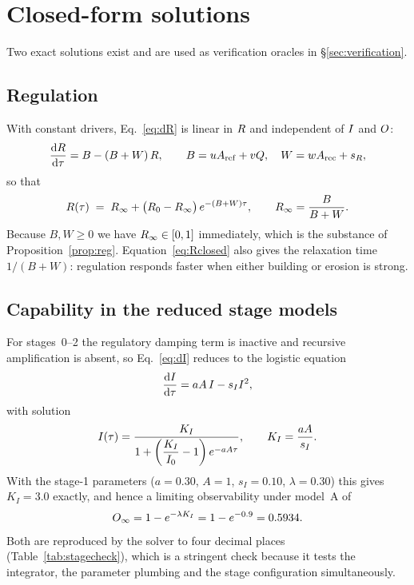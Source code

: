 \section{Closed-form solutions}
\label{app:closed}

Two exact solutions exist and are used as verification oracles in
\S\ref{sec:verification}.

\subsection{Regulation}

With constant drivers, Eq.~\eqref{eq:dR} is linear in $R$ and independent of
$I$ and $O$:
\begin{equation}
  \frac{\mathrm{d}R}{\mathrm{d}\tau} = B - (B+W)\,R ,
  \qquad B = uA_{\mathrm{ref}} + vQ, \quad W = wA_{\mathrm{rec}} + s_R ,
\end{equation}
so that
\begin{equation}
  R(\tau) \;=\; R_\infty + \big(R_0 - R_\infty\big)\,e^{-(B+W)\tau},
  \qquad R_\infty = \frac{B}{B+W} .
  \label{eq:Rclosed}
\end{equation}
Because $B,W \geq 0$ we have $R_\infty \in [0,1]$ immediately, which is the
substance of Proposition~\ref{prop:reg}. Equation~\eqref{eq:Rclosed} also gives
the relaxation time $1/(B+W)$: regulation responds faster when either building or
erosion is strong.

\subsection{Capability in the reduced stage models}

For stages~0--2 the regulatory damping term is inactive and recursive
amplification is absent, so Eq.~\eqref{eq:dI} reduces to the logistic equation
\begin{equation}
  \frac{\mathrm{d}I}{\mathrm{d}\tau} = aA\,I - s_I I^{2},
\end{equation}
with solution
\begin{equation}
  I(\tau) = \frac{K_I}{1 + \left(\dfrac{K_I}{I_0} - 1\right) e^{-aA\tau}},
  \qquad K_I = \frac{aA}{s_I} .
  \label{eq:logistic}
\end{equation}
With the stage-1 parameters ($a=0.30$, $A=1$, $s_I=0.10$, $\lambda=0.30$) this
gives $K_I = 3.0$ exactly, and hence a limiting observability under model~A of
\begin{equation}
  O_\infty = 1 - e^{-\lambda K_I} = 1 - e^{-0.9} = 0.5934 .
\end{equation}
Both are reproduced by the solver to four decimal places
(Table~\ref{tab:stagecheck}), which is a stringent check because it tests the
integrator, the parameter plumbing and the stage configuration simultaneously.

